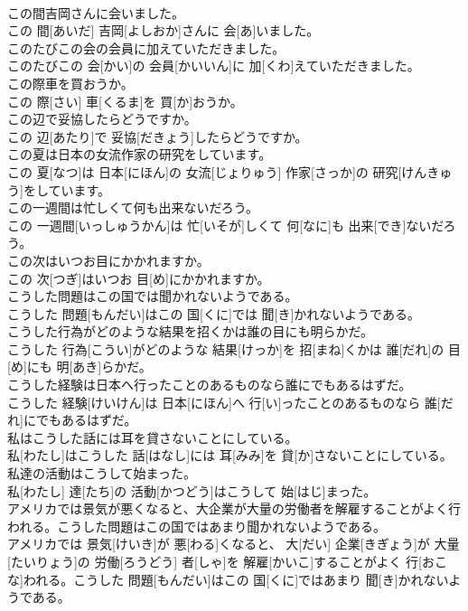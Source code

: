 \documentclass[8pt]{extreport}
\begin{document}
\begin{CJK}{UTF8}{min}
\\	この間吉岡さんに会いました。	
\\	この 間[あいだ] 吉岡[よしおか]さんに 会[あ]いました。
\\	このたびこの会の会員に加えていただきました。	
\\	このたびこの 会[かい]の 会員[かいいん]に 加[くわ]えていただきました。
\\	この際車を買おうか。	
\\	この 際[さい] 車[くるま]を 買[か]おうか。
\\	この辺で妥協したらどうですか。	
\\	この 辺[あたり]で 妥協[だきょう]したらどうですか。
\\	この夏は日本の女流作家の研究をしています。	
\\	この 夏[なつ]は 日本[にほん]の 女流[じょりゅう] 作家[さっか]の 研究[けんきゅう]をしています。
\\	この一週間は忙しくて何も出来ないだろう。	
\\	この 一週間[いっしゅうかん]は 忙[いそが]しくて 何[なに]も 出来[でき]ないだろう。
\\	この次はいつお目にかかれますか。	
\\	この 次[つぎ]はいつお 目[め]にかかれますか。
\\	こうした問題はこの国では聞かれないようである。	
\\	こうした 問題[もんだい]はこの 国[くに]では 聞[き]かれないようである。
\\	こうした行為がどのような結果を招くかは誰の目にも明らかだ。	
\\	こうした 行為[こうい]がどのような 結果[けっか]を 招[まね]くかは 誰[だれ]の 目[め]にも 明[あき]らかだ。
\\	こうした経験は日本へ行ったことのあるものなら誰にでもあるはずだ。	
\\	こうした 経験[けいけん]は 日本[にほん]へ 行[い]ったことのあるものなら 誰[だれ]にでもあるはずだ。
\\	私はこうした話には耳を貸さないことにしている。	
\\	私[わたし]はこうした 話[はなし]には 耳[みみ]を 貸[か]さないことにしている。
\\	私達の活動はこうして始まった。	
\\	私[わたし] 達[たち]の 活動[かつどう]はこうして 始[はじ]まった。
\\	アメリカでは景気が悪くなると、大企業が大量の労働者を解雇することがよく行われる。こうした問題はこの国ではあまり聞かれないようである。	
\\	アメリカでは 景気[けいき]が 悪[わる]くなると、 大[だい] 企業[きぎょう]が 大量[たいりょう]の 労働[ろうどう] 者[しゃ]を 解雇[かいこ]することがよく 行[おこな]われる。こうした 問題[もんだい]はこの 国[くに]ではあまり 聞[き]かれないようである。

\end{CJK}
\end{document}
